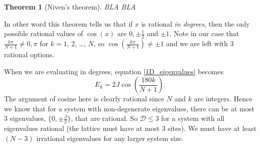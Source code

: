 \documentclass[a4paper,10pt]{article}
\theoremstyle{plain}
\newtheorem{theorem}[]{Theorem}
\begin{document}
\begin{theorem}[Niven's theorem]
    BLA BLA
\end{theorem}
In other word this theorem tells us that if $x$ is rational \textit{in degrees},
then the only possible rational values of $\cos(x)$ are $0, \pm \frac{1}{2}$ and
$\pm 1$. Note in our case that $\frac{k\pi}{N+1}\neq 0, \pi$ for $k=1$, 2,
\dots, $N$, so $\cos{\!(\frac{k\pi}{N+1})} \neq \pm 1$ and we are left with 3
rational options.

When we are evaluating in degrees, equation \eqref{1D_eigenvalues} becomes
\begin{equation}
    E_{k} = 2 J \cos{\!\left ( \frac{180k}{N+1} \right )}.
\end{equation}
The argument of cosine here is clearly rational since $N$ and $k$ are integers.
Hence we know that for a system with non-degenerate eigenvalues, there can be at
most 3 eigenvalues, $\lbrace 0, \pm \frac{J}{2} \rbrace$, that are rational. So
$\mathcal{D} \leq 3$ for a system with all eigenvalues rational (the lattice
must have at most 3 sites). We must have at least $(N-3)$ irrational eigenvalues
for any larger system size. 


\newpage






\end{document}
